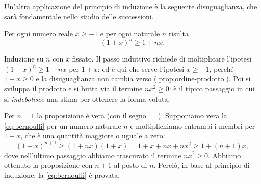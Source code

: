 \begin{marginfigure}
\centering
{}
\caption{Una «dimostrazione senza parole» della \eqref{eq:gauss}: due copie di
$1+2+\dots+n$ riempiono un rettangolo $n\times(n+1)$.}
\end{marginfigure}

Un'altra applicazione del principio di induzione è la seguente disuguaglianza, che
sarà fondamentale nello studio delle successioni.

\begin{teorema}\label{teo:bernoulli}
Per ogni numero reale $x\ge-1$ e per ogni naturale $n$ risulta
\begin{equation}\label{eq:bernoulli}
  (1+x)^{n}\ge1+nx .
\end{equation}
\end{teorema}

\begin{schema}
\end{schema}

\begin{strategia}
Induzione su $n$ con $x$ fissato. Il passo induttivo richiede di moltiplicare
l'ipotesi $(1+x)^{n}\ge1+nx$ per $1+x$: ed è qui che serve l'ipotesi $x\ge-1$, perché
$1+x\ge0$ e la disuguaglianza non cambia verso (\cref{prop:ordine-prodotto}). Poi si
sviluppa il prodotto e si butta via il termine $nx^{2}\ge0$: è il tipico passaggio in
cui si \emph{indebolisce} una stima per ottenere la forma voluta.
\end{strategia}

\begin{dimostrazione}
Per $n=1$ la proposizione è vera (con il segno $=$). Supponiamo vera la
\eqref{eq:bernoulli} per un numero naturale $n$ e moltiplichiamo entrambi i membri per
$1+x$, che è una quantità maggiore o uguale a zero:
\begin{equation}\label{eq:bernoulli-passo}
  (1+x)^{n+1}\ge(1+nx)(1+x)=1+x+nx+nx^{2}\ge1+(n+1)x,
\end{equation}
dove nell'ultimo passaggio abbiamo trascurato il termine $nx^{2}\ge0$. Abbiamo ottenuto
la proposizione con $n+1$ al posto di $n$. Perciò, in base al principio di induzione, la
\eqref{eq:bernoulli} è provata.
\end{dimostrazione}

